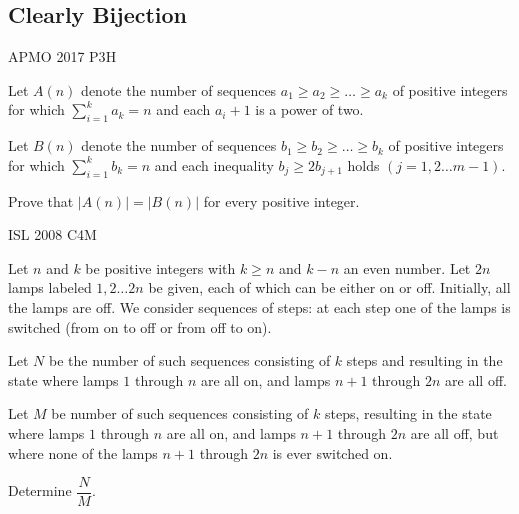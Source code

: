 \subsection{Clearly Bijection}

{APMO 2017 P3}{H}{
    Let $ A(n) $ denote the number of sequences $ a_1\geq a_2\geq \dots\geq
    a_k $ of positive integers for which   $ \sum_{i=1}^k a_k =n $ and each $
    a_i+1 $ is a power of two. 

    Let $ B(n) $ denote the number of sequences $
    b_1\geq b_2\geq\dots\geq b_k $ of positive integers for which $ \sum_{i=1}^k
    b_k =n $ and each inequality $ b_j\geq 2b_{j+1} $ holds $(j=1,2\dots m-1)$. 

    Prove that $ \vert A(n)\vert =\vert B(n)\vert $ for every
    positive integer. 
}\label{problem:add_stuffs_1}\label{problem:bijection_6}





{ISL 2008 C4}{M}{
    Let $ n $ and $ k $ be positive integers with $ k\geq n $ and $k-n$ 
    an even number. Let $ 2n $ lamps labeled $ 1,2\dots 2n $ be given, each
    of which can be either on or off. Initially, all the lamps are off. We
    consider sequences of steps: at each step one of the lamps is switched
    (from on to off or from off to on).

    Let $ N $ be the number of such sequences consisting of $ k $ steps and
    resulting in the state where lamps $ 1 $ through $ n $ are all on, and
    lamps $ n+1 $ through $ 2n $ are all off.

    Let $ M $ be number of such sequences consisting of $ k $ steps, resulting
    in the state where lamps $ 1 $ through $ n $ are all on, and lamps $ n+1 $
    through $ 2n $ are all off, but where none of the lamps $ n+1 $ through $
    2n $ is ever switched on.

    Determine $ \dfrac{N}{M} $.
}\label{problem:bijection_5}



